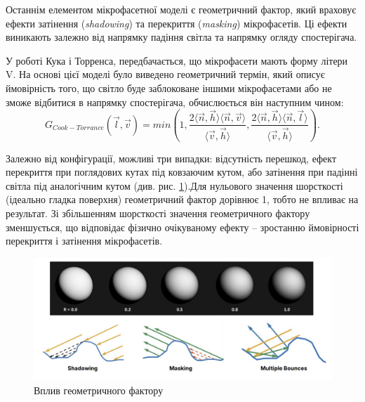 \par
Останнім елементом мікрофасетної моделі є геометричний фактор, який враховує ефекти затінення (\textit{shadowing}) та перекриття (\textit{masking}) 
мікрофасетів. Ці ефекти виникають залежно від напрямку падіння світла та напрямку огляду спостерігача.

У роботі Кука і Торренса, передбачається, що мікрофасети мають форму літери V. 
На основі цієї моделі було виведено геометричний термін, який описує ймовірність того, що світло буде заблоковане іншими мікрофасетами 
або не зможе відбитися в напрямку спостерігача, обчислюється він наступним чином:
\begin{equation*}
  G_{Cook-Torrance}(\vec{l},\vec{v}) = min(1, \frac{2\langle\vec{n},\vec{h}\rangle\langle\vec{n},\vec{v}\rangle}
  {\langle\vec{v},\vec{h}\rangle},
  \frac{2\langle\vec{n},\vec{h}\rangle\langle\vec{n},\vec{l}\rangle}
  {\langle\vec{v},\vec{h}\rangle}).
\end{equation*}

Залежно від конфігурації, можливі три випадки: відсутність перешкод, \linebreak ефект перекриття при поглядових кутах під ковзаючим кутом, 
або затінення при падінні світла під аналогічним кутом (див. рис. \ref{fig:GeometryTerm}).Для нульового значення шорсткості (ідеально гладка поверхня) геометричний фактор дорівнює 1, 
тобто не впливає на результат. Зі збільшенням шорсткості значення геометричного фактору зменшується, 
що відповідає фізично очікуваному ефекту -- зростанню ймовірності перекриття і затінення мікрофасетів.

\begin{figure}[h]
  \centering
  \hspace*{-1.7cm} %
  \includegraphics[scale=0.65]{Pictures/GeometryTerm.png}
  \caption{Вплив геометричного фактору}
  \label{fig:GeometryTerm}
\end{figure}



